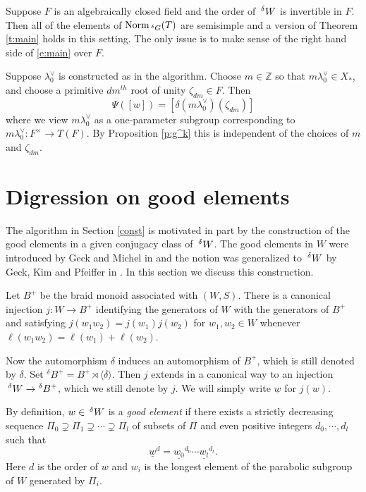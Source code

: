 \documentclass[10pt,leqno]{article}
\newcommand{\Norm}{\text{Norm}}
\newcommand{\Z}{\mathbb Z}
\newcommand{\ch}[1]{#1^\vee}
\renewcommand{\sec}[1]{\section{#1}
\renewcommand{\theequation}{\thesection.\arabic{equation}}
  \setcounter{equation}{0}}
\newcommand{\Wext}{\negthinspace\negthinspace\phantom{a}^\delta W}
\newcommand{\Gext}{\negthinspace\negthinspace\phantom{a}^\delta G}
\renewcommand{\sec}[1]{\section{#1}
\renewcommand{\theequation}{\thesection.\arabic{equation}}
  \setcounter{equation}{0}}
\begin{document}
\begin{remarkplain}
\label{r:otherfield}
Suppose $F$ is an algebraically closed field and the order of $\Wext$ is invertible in $F$.
Then all of the elements of $\Norm_{\Gext}(T)$ are semisimple
and a version of Theorem \ref{t:main} holds in this setting. The only issue is to make
sense of the right hand side of \eqref{e:main} over $F$. 

Suppose $\ch\lambda_0$ is constructed as in the algorithm. Choose $m\in\Z$ so that $m\ch\lambda_0\in X_*$,
and choose a primitive $dm^{th}$ root of unity $\zeta_{dm}\in F$. Then
$$
\Psi([w])=[\delta (m\ch\lambda_0)(\zeta_{dm})]
$$
where we view $m\ch\lambda_0$ as a one-parameter subgroup
corresponding to $m\ch\lambda_0:F^\times\rightarrow T(F)$. By
Proposition \ref{p:g^k} this is independent of the choices of $m$ and
$\zeta_{dm}$.

\end{remarkplain}


\sec{Digression on  good elements}
\label{s:digression}

The algorithm in Section \ref{const} is  motivated in part by
the construction of the good elements in a given conjugacy class of
$\Wext$.
The good elements in $W$ were introduced by Geck and Michel in
\cite{geck_michel_good} and the notion was generalized to $\Wext$ by Geck, Kim and
Pfeiffer in \cite{gkp}.
In this section we discuss this
construction.



Let $B^+$ be the braid monoid associated with $(W,S)$. There is a
canonical injection $j:W\longrightarrow B^+$ identifying the
generators of $W$ with the generators of $B^+$ and
satisfying $j(w_1w_2)=j(w_1)j(w_2)$ for $w_1,w_2\in W$ whenever
$\ell(w_1w_2)=\ell(w_1)+\ell(w_2)$.

Now the automorphism $\delta$ induces an automorphism of $B^+$, which
is still denoted by $\delta$. Set ${}^{\delta} B^+=B^+ \rtimes
\langle\delta\rangle$. Then $j$ extends in a canonical way to an
injection $\Wext \to {}^{\delta} B^+$, which we still denote by
$j$. We will simply write $\underline w$ for $j(w)$.

By definition, $w \in \Wext$ is a {\it good element} if there exists a
strictly decreasing sequence $\Pi_0 \supsetneq \Pi_1 \supsetneq \cdots
\supsetneq \Pi_l$ of subsets of $\Pi$ and even positive integers
$d_0,\cdots,d_l$ such
that $${\underline{w}}^d=\underline{w_0}^{d_0}\cdots\underline{w_l}^{d_l}.$$
Here $d$ is the order of $w$ and $w_i$ is the longest element of the
parabolic subgroup of $W$ generated by $\Pi_i$.
\end{document}
